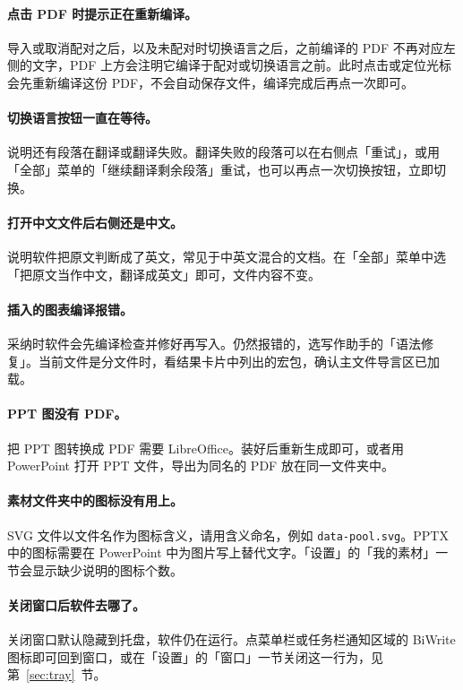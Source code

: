 \documentclass[UTF8,a4paper,11pt]{ctexart}
\newcommand{\ui}[1]{「#1」}
\begin{document}
\paragraph{点击 PDF 时提示正在重新编译。}导入或取消配对之后，以及未配对时切换语言之后，之前编译的 PDF 不再对应左侧的文字，PDF 上方会注明它编译于配对或切换语言之前。此时点击或定位光标会先重新编译这份 PDF，不会自动保存文件，编译完成后再点一次即可。

\paragraph{切换语言按钮一直在等待。}说明还有段落在翻译或翻译失败。翻译失败的段落可以在右侧点\ui{重试}，或用\ui{全部}菜单的\ui{继续翻译剩余段落}重试，也可以再点一次切换按钮，立即切换。

\paragraph{打开中文文件后右侧还是中文。}说明软件把原文判断成了英文，常见于中英文混合的文档。在\ui{全部}菜单中选\ui{把原文当作中文，翻译成英文}即可，文件内容不变。

\paragraph{插入的图表编译报错。}采纳时软件会先编译检查并修好再写入。仍然报错的，选写作助手的\ui{语法修复}。当前文件是分文件时，看结果卡片中列出的宏包，确认主文件导言区已加载。

\paragraph{PPT 图没有 PDF。}把 PPT 图转换成 PDF 需要 LibreOffice。装好后重新生成即可，或者用 PowerPoint 打开 PPT 文件，导出为同名的 PDF 放在同一文件夹中。

\paragraph{素材文件夹中的图标没有用上。}SVG 文件以文件名作为图标含义，请用含义命名，例如 \texttt{data-pool.svg}。PPTX 中的图标需要在 PowerPoint 中为图片写上替代文字。\ui{设置}的\ui{我的素材}一节会显示缺少说明的图标个数。

\paragraph{关闭窗口后软件去哪了。}关闭窗口默认隐藏到托盘，软件仍在运行。点菜单栏或任务栏通知区域的 BiWrite 图标即可回到窗口，或在\ui{设置}的\ui{窗口}一节关闭这一行为，见第~\ref{sec:tray}~节。
\end{document}
